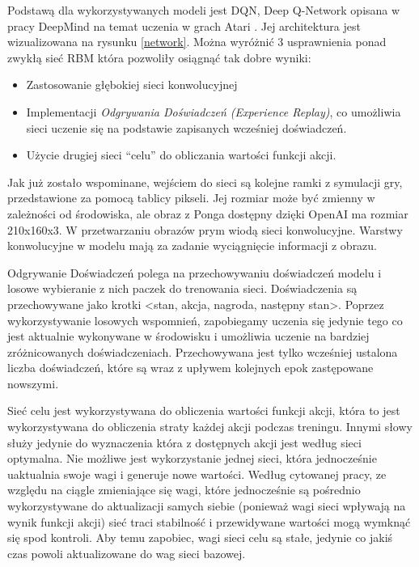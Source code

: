 \documentclass[preprint,12pt]{elsarticle}
\begin{document}
Podstawą dla wykorzystywanych modeli jest DQN, Deep Q-Network opisana w pracy DeepMind na temat uczenia w grach Atari \cite{DeepMind:2015}. Jej architektura jest wizualizowana na rysunku \ref{network}. Można wyróżnić 3 usprawnienia ponad zwykłą sieć RBM która pozwoliły osiągnąć tak dobre wyniki:

\begin{itemize}
\item {Zastosowanie głębokiej sieci konwolucyjnej}
\item {Implementacji \textit{Odgrywania Doświadczeń (Experience Replay)}, co umożliwia sieci uczenie się na podstawie zapisanych wcześniej doświadczeń.}
\item {Użycie drugiej sieci ``celu'' do obliczania wartości funkcji akcji.}
\end{itemize}

Jak już zostało wspominane, wejściem do sieci są kolejne ramki z symulacji gry, przedstawione za pomocą tablicy pikseli. Jej rozmiar może być zmienny w zależności od środowiska, ale obraz z Ponga dostępny dzięki OpenAI ma rozmiar 210x160x3. W przetwarzaniu obrazów prym wiodą sieci konwolucyjne. Warstwy konwolucyjne w modelu mają za zadanie wyciągnięcie informacji z obrazu. 

Odgrywanie Doświadczeń polega na przechowywaniu doświadczeń modelu i losowe wybieranie z nich paczek do trenowania sieci. Doświadczenia są przechowywane jako krotki \textless stan, akcja, nagroda, następny stan\textgreater. Poprzez wykorzystywanie losowych wspomnień, zapobiegamy uczenia się jedynie tego co jest aktualnie wykonywane w środowisku i umożliwia uczenie na bardziej zróżnicowanych doświadczeniach. Przechowywana jest tylko wcześniej ustalona liczba doświadczeń, które są wraz z upływem kolejnych epok zastępowane nowszymi.

Sieć celu jest wykorzystywana do obliczenia wartości funkcji akcji, która to jest wykorzystywana do obliczenia straty każdej akcji podczas treningu. Innymi słowy służy jedynie do wyznaczenia która z dostępnych akcji jest według sieci optymalna. Nie możliwe jest wykorzystanie jednej sieci, która jednocześnie uaktualnia swoje wagi i generuje nowe wartości. Według cytowanej pracy, ze względu na ciągle zmieniające się wagi, które jednocześnie są pośrednio wykorzystywane do aktualizacji samych siebie (ponieważ wagi sieci wpływają na wynik funkcji akcji) sieć traci stabilność i przewidywane wartości mogą wymknąć się spod kontroli. Aby temu zapobiec, wagi sieci celu są stałe, jedynie co jakiś czas powoli aktualizowane do wag sieci bazowej.
\end{document}
